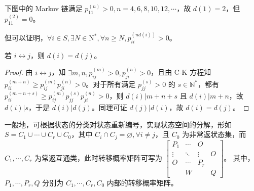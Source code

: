 \documentclass[../main.tex]{subfiles}
\begin{document}
\begin{example}
    下图中的 Markov 链满足 $p_{11}^{(n)}>0,n=4,6,8,10,12,\cdots$，故 $d(1)=2$，但 $p_{11}^{(2)}=0$。
    \begin{center}
    \end{center}
    \bigskip
\end{example}

但可以证明，$\forall i\in S,\exists N\in\mathrm N^*,\forall n\geq N,p_{ii}^{(nd(i))}>0$。

\begin{theorem}\label{thm:7.3.3}
    若 $i\leftrightarrow j$，则 $d(i)=d(j)$。
\end{theorem}

\begin{proof}
    由 $i\leftrightarrow j$，知 $\exists m,n,p_{ij}^{(m)}>0,p_{ji}^{(n)}>0$，且由 C-K 方程知 $p_{ii}^{(m+n)}\geq p_{ij}^{(m)}p_{ji}^{(n)}>0$。对于所有满足 $p_{jj}^{(s)}>0$ 的 $s\in\mathbb N^*$，都有 $p_{ii}^{(m+n+s)}\geq p_{ij}^{(m)}p_{jj}^{(s)}p_{ji}^{(n)}>0$，则 $d(i)|m+n+s$ 且 $d(i)|m+n$，故 $d(i)|s$，于是 $d(i)|d(j)$。同理可证 $d(j)|d(i)$，故 $d(i)=d(j)$。
\end{proof}

一般地，可根据状态的分类对状态重新编号，实现状态空间的分解，形如 $S=C_1\cup\cdots\cup C_r\cup C_0$，其中 $C_i\cap C_j=\varnothing,\forall i\neq j$，且 $C_0$ 为非常返状态集，而 $C_1,\cdots,C_r$ 为常返互通类，此时转移概率矩阵可写为
$\left[\begin{matrix}
            P_1    & \cdots & O      &   \\
            \vdots & \ddots & \vdots & O \\
            O      & \cdots & P_r    &   \\
                   & W      &        & Q
        \end{matrix}\right]$。
其中，$P_1,\cdots,P_r,Q$ 分别为 $C_1,\cdots,C_r,C_0$ 内部的转移概率矩阵。
\end{document}
